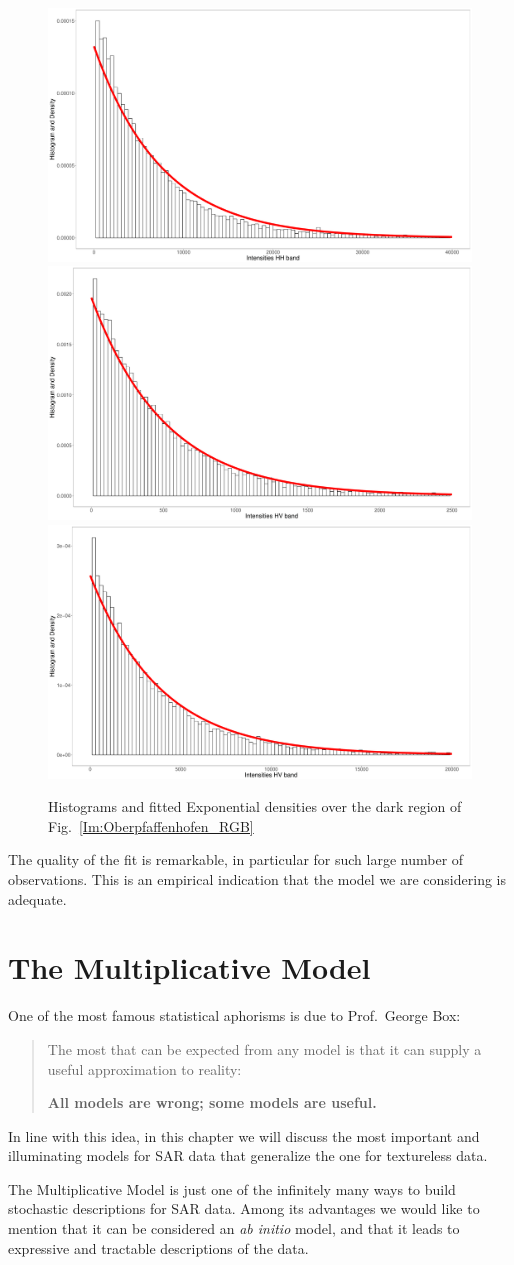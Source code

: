 \documentclass{beamer}
\begin{document}
\begin{frame}
\begin{figure}
\centering
\includegraphics[width=.32\linewidth]{darkHHfit}
\includegraphics[width=.32\linewidth]{darkHVfit}
\includegraphics[width=.32\linewidth]{darkVVfit}
\caption{Histograms and fitted Exponential densities over the dark region of Fig.~\ref{Im:Oberpfaffenhofen_RGB}}\label{Fig:FittedDarkRegion}
\end{figure}

The quality of the fit is remarkable, in particular for such large number of observations.
This is an empirical indication that the model we are considering is adequate.
\end{frame}


\section{The Multiplicative Model}

\begin{frame}[allowframebreaks]
One of the most famous statistical aphorisms is due to Prof.~George Box:
\begin{quotation}
The most that can be expected from any model is that it can supply a useful approximation to reality:

\textbf{All models are wrong; some models are useful.}
\end{quotation}
In line with this idea, in this chapter we will discuss the most important and illuminating models for SAR data that generalize the one for textureless data.

The Multiplicative Model is just one of the infinitely many ways to build stochastic descriptions for SAR data.
Among its advantages we would like to mention that it can be considered an \textit{ab initio} model, and that it leads to expressive and tractable descriptions of the data.
\end{frame}
\end{document}
